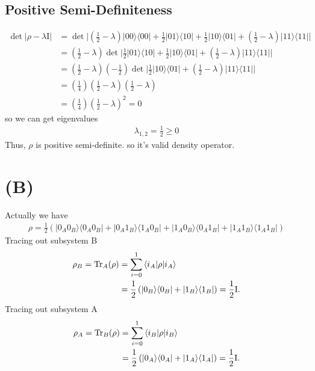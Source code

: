 \documentclass{article}
\newcommand{\op}[2]{|#1\rangle \langle#2|}
\newcommand{\sand}[3]{\braket{#1 | #2 | #3}}
\begin{document}
\subsection*{Positive Semi-Definiteness}
\begin{align*}
    \det |\rho - \lambda\text{I}| &= \det \bigg| (\frac{1}{2}-\lambda) \op{00}{00} + \frac{1}{2}\op{01}{10} + \frac{1}{2}\op{10}{01} + (\frac{1}{2}-\lambda) \op{11}{11} \bigg| \\
    &= (\frac{1}{2}-\lambda)\det\bigg|\frac{1}{2}\op{01}{10} + \frac{1}{2}\op{10}{01} + (\frac{1}{2}-\lambda) \op{11}{11}\bigg| \\
    &= (\frac{1}{2}-\lambda)(-\frac{1}{2})\det\bigg|\frac{1}{2}\op{10}{01} + (\frac{1}{2}-\lambda)\op{11}{11}\bigg| \\
    &= (\frac{1}{4})(\frac{1}{2}-\lambda)(\frac{1}{2}-\lambda) \\
    &= (\frac{1}{4})(\frac{1}{2}-\lambda)^2 = 0
\end{align*}
so we can get eigenvalues
\begin{align*}
   \lambda_{1,2} = \frac{1}{2} \ge 0
\end{align*}
Thus, $\rho$ is positive semi-definite. so it's valid density operator.
\section*{(B)}
Actually we have
\begin{align*}
    \rho = \frac{1}{2} \left( \op{0_A0_B}{0_A0_B} + \op{0_A1_B}{1_A0_B} + \op{1_A0_B}{0_A1_B} + \op{1_A1_B}{1_A1_B} \right)
\end{align*}
Tracing out subsystem B
\begin{align*}
\rho_B = \text{Tr}_A(\rho) &= \sum_{i=0}^{1} \sand{i_A}{\rho}{i_A} \\
&= \frac{1}{2} \left( \op{0_B}{0_B} + \op{1_B}{1_B} \right) = \frac{1}{2} \text{I}.
\end{align*}
Tracing out subsystem A
\begin{align*}
\rho_A = \text{Tr}_B(\rho) &= \sum_{i=0}^{1} \sand{i_B}{\rho}{i_B} \\
&= \frac{1}{2} \left( \op{0_A}{0_A} + \op{1_A}{1_A} \right) = \frac{1}{2} \text{I}.
\end{align*}
\end{document}
